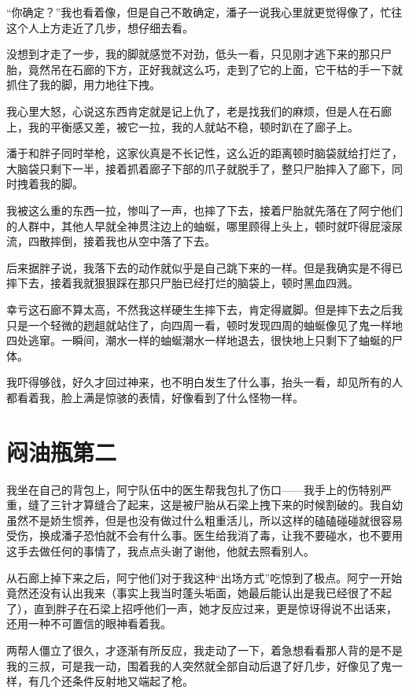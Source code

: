 “你确定？”我也看着像，但是自己不敢确定，潘子一说我心里就更觉得像了，忙往这个人上方走近了几步，想仔细去看。

没想到才走了一步，我的脚就感觉不对劲，低头一看，只见刚才逃下来的那只尸胎，竟然吊在石廊的下方，正好我就这么巧，走到了它的上面，它干枯的手一下就抓住了我的脚，用力地往下拽。

我心里大怒，心说这东西肯定就是记上仇了，老是找我们的麻烦，但是人在石廊上，我的平衡感又差，被它一拉，我的人就站不稳，顿时趴在了廊子上。

潘于和胖子同时举枪，这家伙真是不长记性，这么近的距离顿时脑袋就给打烂了，大脑袋只剩下一半，接着抓着廊子下部的爪子就脱手了，整只尸胎摔入了廊下，同时拽着我的脚。

我被这么重的东西一拉，惨叫了一声，也摔了下去，接着尸胎就先落在了阿宁他们的人群中，其他人早就全神贯注边上的蚰蜒，哪里顾得上头上，顿时就吓得屁滚尿流，四散摔倒，接着我也从空中落了下去。

后来据胖子说，我落下去的动作就似乎是自己跳下来的一样。但是我确实是不得已摔下去，接着我就狠狠踩在那只尸胎已经打烂的脑袋上，顿时黑血四溅。

幸亏这石廊不算太高，不然我这样硬生生摔下去，肯定得崴脚。但是摔下去之后我只是一个轻微的趔趄就站住了，向四周一看，顿时发现四周的蚰蜒像见了鬼一样地四处逃窜。一瞬间，潮水一样的蚰蜒潮水一样地退去，很快地上只剩下了蚰蜒的尸体。

我吓得够戗，好久才回过神来，也不明白发生了什么事，抬头一看，却见所有的人都看着我，脸上满是惊骇的表情，好像看到了什么怪物一样。

\chapter{闷油瓶第二}

我坐在自己的背包上，阿宁队伍中的医生帮我包扎了伤口——我手上的伤特别严重，缝了三针才算缝合了起来，这是被尸胎从石梁上拽下来的时候割破的。我自幼虽然不是娇生惯养，但是也没有做过什么粗重活儿，所以这样的磕磕碰碰就很容易受伤，换成潘子恐怕就不会有什么事。医生给我消了毒，让我不要碰水，也不要用这手去做任何的事情了，我点点头谢了谢他，他就去照看别人。

从石廊上掉下来之后，阿宁他们对于我这种“出场方式”吃惊到了极点。阿宁一开始竟然还没有认出我来（事实上我当时蓬头垢面，她最后能认出是我已经很了不起了），直到胖子在石梁上招呼他们一声，她才反应过来，更是惊讶得说不出话来，还用一种不可置信的眼神看着我。

两帮人僵立了很久，才逐渐有所反应，我走动了一下，着急想看看那人背的是不是我的三叔，可是我一动，围着我的人突然就全部自动后退了好几步，好像见了鬼一样，有几个还条件反射地又端起了枪。

